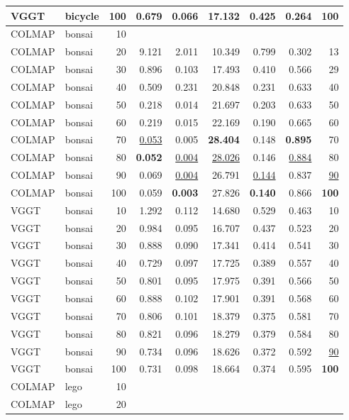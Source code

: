 \begin{table}[H]
\begin{tabular}{llrrrrrrr}
VGGT & bicycle & 100 & 0.679 & 0.066 & 17.132 & 0.425 & 0.264 & \textbf{100} \\
\midrule
COLMAP & bonsai & 10 &  &  &  &  &  &  \\
COLMAP & bonsai & 20 & 9.121 & 2.011 & 10.349 & 0.799 & 0.302 & 13 \\
COLMAP & bonsai & 30 & 0.896 & 0.103 & 17.493 & 0.410 & 0.566 & 29 \\
COLMAP & bonsai & 40 & 0.509 & 0.231 & 20.848 & 0.231 & 0.633 & 40 \\
COLMAP & bonsai & 50 & 0.218 & 0.014 & 21.697 & 0.203 & 0.633 & 50 \\
COLMAP & bonsai & 60 & 0.219 & 0.015 & 22.169 & 0.190 & 0.665 & 60 \\
COLMAP & bonsai & 70 & \underline{0.053} & 0.005 & \textbf{28.404} & 0.148 & \textbf{0.895} & 70 \\
COLMAP & bonsai & 80 & \textbf{0.052} & \underline{0.004} & \underline{28.026} & 0.146 & \underline{0.884} & 80 \\
COLMAP & bonsai & 90 & 0.069 & \underline{0.004} & 26.791 & \underline{0.144} & 0.837 & \underline{90} \\
COLMAP & bonsai & 100 & 0.059 & \textbf{0.003} & 27.826 & \textbf{0.140} & 0.866 & \textbf{100} \\
VGGT & bonsai & 10 & 1.292 & 0.112 & 14.680 & 0.529 & 0.463 & 10 \\
VGGT & bonsai & 20 & 0.984 & 0.095 & 16.707 & 0.437 & 0.523 & 20 \\
VGGT & bonsai & 30 & 0.888 & 0.090 & 17.341 & 0.414 & 0.541 & 30 \\
VGGT & bonsai & 40 & 0.729 & 0.097 & 17.725 & 0.389 & 0.557 & 40 \\
VGGT & bonsai & 50 & 0.801 & 0.095 & 17.975 & 0.391 & 0.566 & 50 \\
VGGT & bonsai & 60 & 0.888 & 0.102 & 17.901 & 0.391 & 0.568 & 60 \\
VGGT & bonsai & 70 & 0.806 & 0.101 & 18.379 & 0.375 & 0.581 & 70 \\
VGGT & bonsai & 80 & 0.821 & 0.096 & 18.279 & 0.379 & 0.584 & 80 \\
VGGT & bonsai & 90 & 0.734 & 0.096 & 18.626 & 0.372 & 0.592 & \underline{90} \\
VGGT & bonsai & 100 & 0.731 & 0.098 & 18.664 & 0.374 & 0.595 & \textbf{100} \\
\midrule
COLMAP & lego & 10 &  &  &  &  &  &  \\
COLMAP & lego & 20 &  &  &  &  &  &  \\

\end{tabular}
\end{table}
